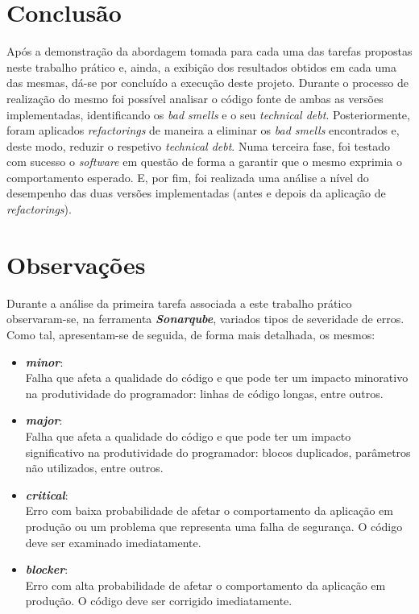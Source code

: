 \documentclass[a4paper]{report}
\begin{document}
\chapter{Conclusão}
Após a demonstração da abordagem tomada para cada uma das tarefas propostas neste trabalho prático e, ainda, a exibição dos resultados obtidos em cada uma das mesmas, dá-se por concluído a execução deste projeto. 
Durante o processo de realização do mesmo foi possível analisar o código fonte de ambas as versões implementadas, identificando os \textit{bad smells} e o seu \textit{technical debt}. Posteriormente, foram aplicados \textit{refactorings}
de maneira a eliminar os \textit{bad smells} encontrados e, deste modo, reduzir o respetivo \textit{technical debt}. Numa terceira fase, foi testado com sucesso o \textit{software} em questão de forma a garantir que o mesmo exprimia o 
comportamento esperado. E, por fim, foi realizada uma análise a nível do desempenho das duas versões implementadas (antes e depois da aplicação de \textit{refactorings}).

\appendix
\chapter{Observações}
Durante a análise da primeira tarefa associada a este trabalho prático observaram-se, na ferramenta \textit{\textbf{Sonarqube}}, variados tipos de severidade de erros. Como tal, apresentam-se de seguida, de forma mais detalhada, os mesmos:
\begin{itemize}
    \item \textbf{\textit{minor}}:
    \\ Falha que afeta a qualidade do código e que pode ter um impacto minorativo na produtividade do programador: linhas de código longas, entre outros.
    \item \textbf{\textit{major}}:
    \\ Falha que afeta a qualidade do código e que pode ter um impacto significativo na produtividade do programador: blocos duplicados, parâmetros não utilizados, entre outros.
    \item \textbf{\textit{critical}}:
    \\ Erro com baixa probabilidade de afetar o comportamento da aplicação em produção ou um problema que representa uma falha de segurança. O código deve ser examinado imediatamente.
    \item \textbf{\textit{blocker}}:
    \\ Erro com alta probabilidade de afetar o comportamento da aplicação em produção. O código deve ser corrigido imediatamente.
\end{itemize}
\end{document}
